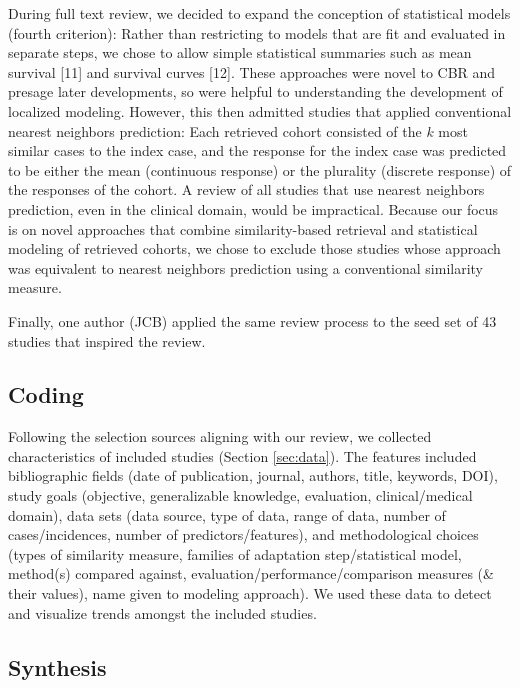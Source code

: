 \documentclass[preprint, 3p,
authoryear]{elsarticle} %
\begin{document}
During full text review, we decided to expand the conception of
statistical models (fourth criterion): Rather than restricting to models
that are fit and evaluated in separate steps, we chose to allow simple
statistical summaries such as mean survival {[}11{]} and survival curves
{[}12{]}. These approaches were novel to CBR and presage later
developments, so were helpful to understanding the development of
localized modeling. However, this then admitted studies that applied
conventional nearest neighbors prediction: Each retrieved cohort
consisted of the \(k\) most similar cases to the index case, and the
response for the index case was predicted to be either the mean
(continuous response) or the plurality (discrete response) of the
responses of the cohort. A review of all studies that use nearest
neighbors prediction, even in the clinical domain, would be impractical.
Because our focus is on novel approaches that combine similarity-based
retrieval and statistical modeling of retrieved cohorts, we chose to
exclude those studies whose approach was equivalent to nearest neighbors
prediction using a conventional similarity measure.

Finally, one author (JCB) applied the same review process to the seed
set of 43 studies that inspired the review.

\hypertarget{coding}{%
\subsection{Coding}\label{coding}}

Following the selection sources aligning with our review, we collected
characteristics of included studies (Section \ref{sec:data}). The
features included bibliographic fields (date of publication, journal,
authors, title, keywords, DOI), study goals (objective, generalizable
knowledge, evaluation, clinical/medical domain), data sets (data source,
type of data, range of data, number of cases/incidences, number of
predictors/features), and methodological choices (types of similarity
measure, families of adaptation step/statistical model, method(s)
compared against, evaluation/performance/comparison measures (\& their
values), name given to modeling approach). We used these data to detect
and visualize trends amongst the included studies.

\hypertarget{synthesis}{%
\subsection{Synthesis}\label{synthesis}}
\end{document}
